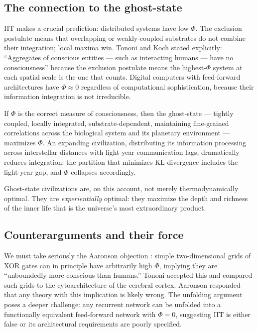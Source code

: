 \documentclass[12pt, a4paper]{article}
\newcommand{\phiIIT}{\Phi}
\begin{document}
\subsection{The connection to the ghost-state}

IIT makes a crucial prediction: distributed systems have low $\phiIIT$. The exclusion postulate
means that overlapping or weakly-coupled substrates do not combine their integration; local
maxima win. Tononi and Koch \citep{tononi2015} stated explicitly: ``Aggregates of conscious
entities --- such as interacting humans --- have no consciousness'' because the exclusion
postulate means the highest-$\phiIIT$ system at each spatial scale is the one that counts.
Digital computers with feed-forward architectures have $\phiIIT \approx 0$ regardless of
computational sophistication, because their information integration is not irreducible.

If $\phiIIT$ is the correct measure of consciousness, then the ghost-state --- tightly coupled,
locally integrated, substrate-dependent, maintaining fine-grained correlations across the
biological system and its planetary environment --- maximizes $\phiIIT$. An expanding
civilization, distributing its information processing across interstellar distances with
light-year communication lags, dramatically reduces integration: the partition that minimizes
KL divergence includes the light-year gap, and $\phiIIT$ collapses accordingly.

Ghost-state civilizations are, on this account, not merely thermodynamically optimal. They
are \textit{experientially} optimal: they maximize the depth and richness of the inner life
that is the universe's most extraordinary product.

\subsection{Counterarguments and their force}

We must take seriously the Aaronson objection \citep{aaronson2014}: simple two-dimensional
grids of XOR gates can in principle have arbitrarily high $\phiIIT$, implying they are
``unboundedly more conscious than humans.'' Tononi accepted this and compared such grids to
the cytoarchitecture of the cerebral cortex. Aaronson responded that any theory with this
implication is likely wrong. The unfolding argument \citep{doerig2019} poses a deeper
challenge: any recurrent network can be unfolded into a functionally equivalent feed-forward
network with $\phiIIT = 0$, suggesting IIT is either false or its architectural requirements
are poorly specified.
\end{document}
